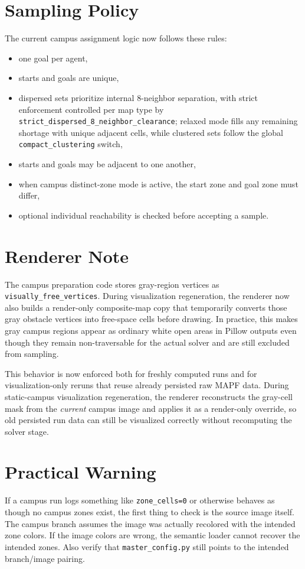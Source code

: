 \documentclass[11pt]{article}
\begin{document}
\section{Sampling Policy}

The current campus assignment logic now follows these rules:
\begin{itemize}[leftmargin=2em]
    \item one goal per agent,
    \item starts and goals are unique,
    \item dispersed sets prioritize internal 8-neighbor separation, with strict enforcement controlled per map type by \texttt{strict\_dispersed\_8\_neighbor\_clearance}; relaxed mode fills any remaining shortage with unique adjacent cells, while clustered sets follow the global \texttt{compact\_clustering} switch,
    \item starts and goals may be adjacent to one another,
    \item when campus distinct-zone mode is active, the start zone and goal zone must differ,
    \item optional individual reachability is checked before accepting a sample.
\end{itemize}

\section{Renderer Note}

The campus preparation code stores gray-region vertices as \texttt{visually\_free\_vertices}. During visualization regeneration, the renderer now also builds a render-only composite-map copy that temporarily converts those gray obstacle vertices into free-space cells before drawing. In practice, this makes gray campus regions appear as ordinary white open areas in Pillow outputs even though they remain non-traversable for the actual solver and are still excluded from sampling.

This behavior is now enforced both for freshly computed runs and for visualization-only reruns that reuse already persisted raw MAPF data. During static-campus visualization regeneration, the renderer reconstructs the gray-cell mask from the \emph{current} campus image and applies it as a render-only override, so old persisted run data can still be visualized correctly without recomputing the solver stage.

\section{Practical Warning}

If a campus run logs something like \texttt{zone\_cells=0} or otherwise behaves as though no campus zones exist, the first thing to check is the source image itself. The campus branch assumes the image was actually recolored with the intended zone colors. If the image colors are wrong, the semantic loader cannot recover the intended zones. Also verify that \texttt{master\_config.py} still points to the intended branch/image pairing.
\end{document}
